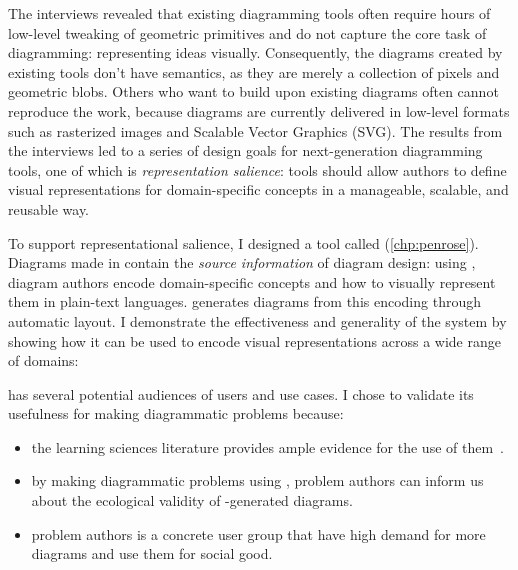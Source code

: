 \label{rq:diagrammer}

\noindent The interviews revealed that existing diagramming tools often require hours of low-level tweaking of geometric primitives and do not capture the core task of diagramming: representing ideas visually. Consequently, the diagrams created by existing tools don't have semantics, as they are merely a collection of pixels and geometric blobs. Others who want to build upon existing diagrams often cannot reproduce the work, because diagrams are currently delivered in low-level formats such as rasterized images and Scalable Vector Graphics (SVG). The results from the interviews led to a series of design goals for next-generation diagramming tools, one of which is \textit{representation salience}: tools should allow authors to define visual representations for domain-specific concepts in a manageable, scalable, and reusable way. 

To support representational salience, I designed a tool called \Penrose (\cref{chp:penrose}). Diagrams made in \Penrose contain the \emph{source information} of diagram design: using \Penrose, diagram authors encode domain-specific concepts and how to visually represent them in plain-text languages. \Penrose generates diagrams from this encoding through automatic layout. I demonstrate the effectiveness and generality of the system by showing how it can be used to encode visual representations across a wide range of domains:

\label{rq:expressiveness}

\Penrose has several potential audiences of users and use cases. I chose to validate its usefulness for making diagrammatic problems because:

\begin{itemize}
    \item the learning sciences literature provides ample evidence for the use of them~\cite{multipleReps, mayer_multimedia_2002, blum_combining_1998}.
    \item by making diagrammatic problems using \Penrose, problem authors can inform us about the ecological validity of \Penrose-generated diagrams.
    \item problem authors is a concrete user group that have high demand for more diagrams and use them for social good.
\end{itemize}

